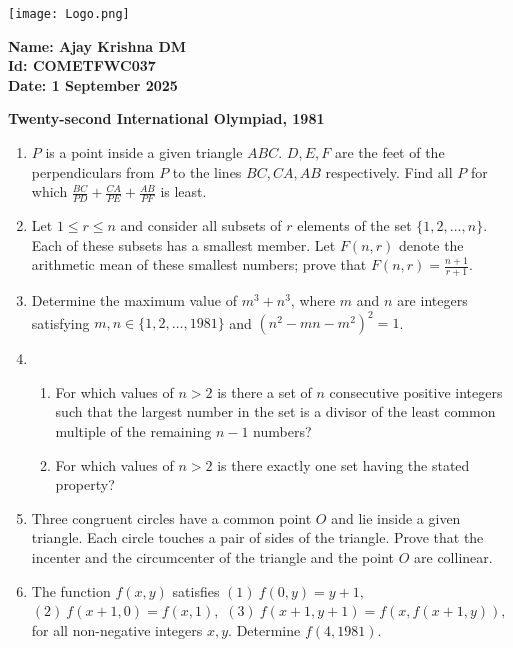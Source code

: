 \documentclass[12pt]{article}
\begin{document}
\begin{minipage}{0.45\textwidth}
  \texttt{[image: Logo.png]}
\end{minipage}
\hfill
\begin{minipage}{0.45\textwidth}
  \raggedleft
  \textbf{Name: Ajay Krishna DM}\\
  \textbf{Id: COMETFWC037}\\
  \textbf{Date: 1 September 2025}\\
\end{minipage}

\vspace{1cm}

\begin{center}
\textbf{Twenty-second International Olympiad, 1981}
\end{center}

\begin{enumerate}
  \item $P$ is a point inside a given triangle $ABC$. $D, E, F$ are the feet of the perpendiculars from $P$ to the lines $BC, CA, AB$ respectively. Find all $P$ for which  
  $ \frac{BC}{PD} + \frac{CA}{PE} + \frac{AB}{PF} $  
  is least.

  \item Let $1 \leq r \leq n$ and consider all subsets of $r$ elements of the set $\{1,2,\ldots,n\}$. Each of these subsets has a smallest member. Let $F(n,r)$ denote the arithmetic mean of these smallest numbers; prove that  
  $ F(n,r) = \frac{n+1}{r+1} $.

  \item Determine the maximum value of $m^3+n^3$, where $m$ and $n$ are integers satisfying $m,n \in \{1,2,\ldots,1981\}$ and $(n^2-mn-m^2)^2 = 1$.

  \item 
  \begin{enumerate}
    \item For which values of $n > 2$ is there a set of $n$ consecutive positive integers such that the largest number in the set is a divisor of the least common multiple of the remaining $n-1$ numbers?
    \item For which values of $n > 2$ is there exactly one set having the stated property?
  \end{enumerate}

  \item Three congruent circles have a common point $O$ and lie inside a given triangle. Each circle touches a pair of sides of the triangle. Prove that the incenter and the circumcenter of the triangle and the point $O$ are collinear.

  \item The function $f(x,y)$ satisfies  
  $ (1)\ f(0,y) = y+1, $  
  $ (2)\ f(x+1,0) = f(x,1), $  
  $ (3)\ f(x+1,y+1) = f(x, f(x+1,y)), $  
  for all non-negative integers $x,y$. Determine $f(4,1981)$.
\end{enumerate}
\end{document}
